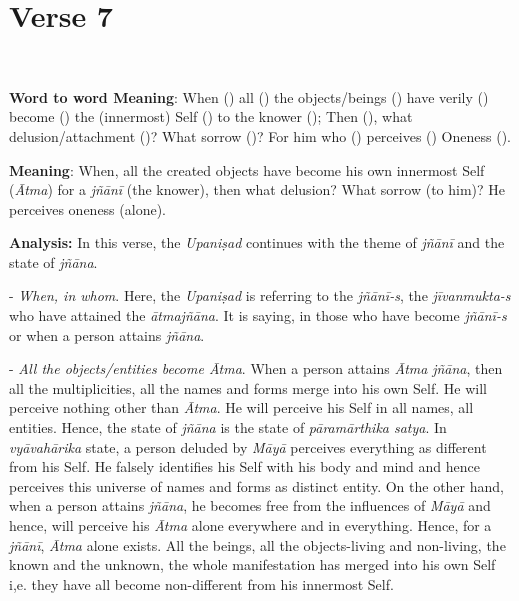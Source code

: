 \chapter{Verse 7}

\begin{moolashloka}
\\
\end{moolashloka}

\textbf{Word to word Meaning}: When () all () the objects/beings () have verily () become () the (innermost) Self () to the knower (); Then (), what delusion/attachment ()? What sorrow ()? For him who () perceives () Oneness ().

\textbf{Meaning}: When, all the created objects have become his own innermost Self (\emph{Ātma}) for a \emph{jñānī} (the knower), then what delusion? What sorrow (to him)? He perceives oneness (alone).

\textbf{Analysis:} In this verse, the \emph{Upaniṣad} continues with the theme of \emph{jñānī} and the state of \emph{jñāna}.

- \emph{When, in whom}. Here, the \emph{Upaniṣad} is referring to the \emph{jñānī-s}, the \emph{jīvanmukta-s} who have attained the \emph{ātmajñāna}. It is saying, in those who have become \emph{jñānī-s} or when a person attains \emph{jñāna}.

- \emph{All the objects/entities become Ātma}. When a person attains \emph{Ātma} \emph{jñāna}, then all the multiplicities, all the names and forms merge into his own Self. He will perceive nothing other than \emph{Ātma}. He will perceive his Self in all names, all entities. Hence, the state of \emph{jñāna} is the state of \emph{pāramārthika satya}. In \emph{vyāvahārika} state, a person deluded by \emph{Māyā} perceives everything as different from his Self. He falsely identifies his Self with his body and mind and hence perceives this universe of names and forms as distinct entity. On the other hand, when a person attains \emph{jñāna}, he becomes free from the influences of \emph{Māyā} and hence, will perceive his \emph{Ātma} alone everywhere and in everything. Hence, for a \emph{jñānī}, \emph{Ātma} alone exists. All the beings, all the objects-living and non-living, the known and the unknown, the whole manifestation has merged into his own Self i,e. they have all become non-different from his innermost Self.

